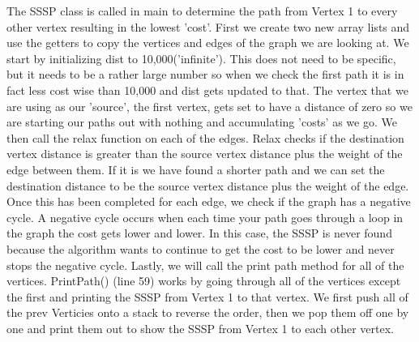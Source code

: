 \documentclass{article}
\begin{document}
The SSSP class is called in main to determine the path from Vertex 1 to every other vertex resulting in the lowest 'cost'. First we create two new array lists and use the getters to copy the vertices and edges of the graph we are looking at. We start by initializing dist to 10,000('infinite'). This does not need to be specific, but it needs to be a rather large number so when we check the first path it is in fact less cost wise than 10,000 and dist gets updated to that. The vertex that we are using as our 'source', the first vertex, gets set to have a distance of zero so we are starting our paths out with nothing and accumulating 'costs' as we go. We then call the relax function on each of the edges. Relax checks if the destination vertex distance is greater than the source vertex distance plus the weight of the edge between them. If it is we have found a shorter path and we can set the destination distance to be the source vertex distance plus the weight of the edge. Once this has been completed for each edge, we check if the graph has a negative cycle. A negative cycle occurs when each time your path goes through a loop in the graph the cost gets lower and lower. In this case, the SSSP is never found because the algorithm wants to continue to get the cost to be lower and never stops the negative cycle. Lastly, we will call the print path method for all of the vertices. PrintPath() (line 59) works by going through all of the vertices except the first and printing the SSSP from Vertex 1 to that vertex. We first push all of the prev Verticies onto a stack to reverse the order, then we pop them off one by one and print them out to show the SSSP from Vertex 1 to each other vertex. 

\small
\end{document}
